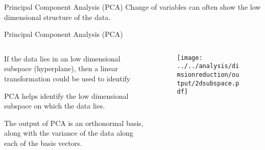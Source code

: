 \documentclass[aspectratio=169]{beamer}
\def\lp{\ensuremath\left(}
\def\rp{\ensuremath\right)}
\newcommand{\ct}[1]{\lp #1\rp}
\begin{document}
\begin{frame}[t]{Principal Component Analysis (PCA)}
  Change of variables can often show the low dimensional structure of the data.
  \begin{center}
\end{center}
\end{frame}


\begin{frame}[t]{Principal Component Analysis (PCA)}
  \begin{columns}
    \begin{column}{0.4\textwidth}
      If the data lies in an low dimensional subspace (hyperplane), then a linear transformation could be used to identify 
      \vspace{0.2cm}

      PCA helps identify the low dimensional subspace on which the data lies.
      \vspace{0.2cm}

      The output of PCA is an orthonormal basis, along with the variance of the data along each of the basis vectors.
    \end{column}
    \begin{column}{0.575\textwidth}
      \begin{figure}
        \centering
        \texttt{[image: ../../analysis/dimsionreduction/output/2dsubspace.pdf]}
      \end{figure}
    \end{column}
  \end{columns}
\end{frame}
\end{document}
